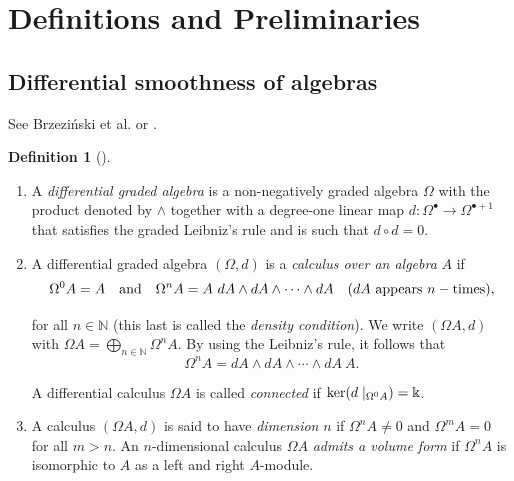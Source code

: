 \documentclass{amsart}
\theoremstyle{definition}
\newtheorem{definition}[theorem]{Definition}
\theoremstyle{remark}
\numberwithin{equation}{section}
\begin{document}
\section{Definitions and Preliminaries}\label{PreliminariesDifferentialsmoothnessofbi-quadraticalgebras}

\subsection{Differential smoothness of algebras}\label{DefinitionsandpreliminariesDSA}

See Brzezi\'nski et al. \cite[Section 2]{BrzezinskiSitarz2017} or \cite{Brzezinski2008, Brzezinski2014, BrzezinskiElKaoutitLomp2010}.

\begin{definition}[{\cite[Section 2.1]{BrzezinskiSitarz2017}}]
\begin{enumerate}
    \item [\rm (i)] A {\em differential graded algebra} is a non-negatively graded algebra $\Omega$ with the product denoted by $\wedge$ together with a degree-one linear map $d:\Omega^{\bullet} \to \Omega^{\bullet +1}$ that satisfies the graded Leibniz's rule and is such that $d \circ d = 0$. 
    
    \item [\rm (ii)] A differential graded algebra $(\Omega, d)$ is a {\em calculus over an algebra} $A$ if 
    $$
    \Omega^0 A = A \quad {\rm and} \quad \Omega^n A = A\ dA \wedge dA \wedge \dotsb \wedge dA \quad (dA \ {\rm appears} \ n-{\rm times}), 
    $$
    
    for all $n\in \mathbb{N}$ (this last is called the {\em density condition}). We write $(\Omega A, d)$ with $\Omega A = \bigoplus_{n\in \mathbb{N}} \Omega^{n}A$. By using the Leibniz's rule, it follows that 
    $$
    \Omega^n A = dA \wedge dA \wedge \dotsb \wedge dA\ A.
    $$
    
    A differential calculus $\Omega A$ is called {\em connected} if ${\rm ker}(d\mid_{\Omega^0 A}) = \Bbbk$.
    
    \item [\rm (iii)] A calculus $(\Omega A, d)$ is said to have {\em dimension} $n$ if $\Omega^n A\neq 0$ and $\Omega^m A = 0$ for all $m > n$. An $n$-dimensional calculus $\Omega A$ {\em admits a volume form} if $\Omega^n A$ is isomorphic to $A$ as a left and right $A$-module. 
\end{enumerate}
\end{definition}
\end{document}

